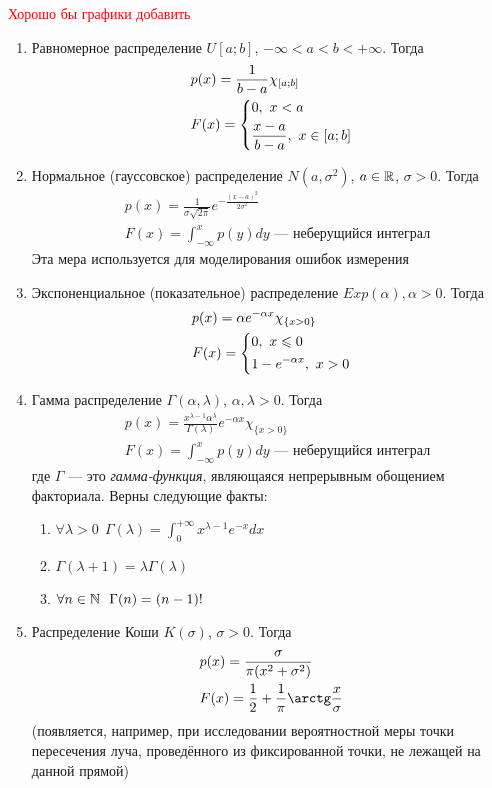 \textcolor{red}{Хорошо бы графики добавить}

\begin{enumerate}
	\item Равномерное распределение $U[a; b]$, $-\infty < a < b < +\infty$. Тогда
	\begin{align*}
		&{p(x) = \frac{1}{b - a}\chi_{[a; b]}}
		\\
		&{F(x) = \left\{\begin{aligned}
			&{0,\ x < a}
			\\
			&{\frac{x - a}{b - a},\ x \in [a; b]}
		\end{aligned}\right.}
	\end{align*}
	
	\item Нормальное (гауссовское) распределение $N(a, \sigma^2)$, $a \in \mathbb{R}$, $\sigma > 0$. Тогда
	\begin{align*}
		&{p(x) = \frac{1}{\sigma\sqrt{2\pi}}e^{-\frac{(x - a)^2}{2\sigma^2}}}
		\\
		&{F(x) = \int_{-\infty}^x p(y)dy \text{ --- неберущийся интеграл}}
	\end{align*}
	Эта мера используется для моделирования ошибок измерения
	
	\item Экспоненциальное (показательное) распределение $Exp(\alpha), \alpha > 0$. Тогда
	\begin{align*}
		&{p(x) = \alpha e^{-\alpha x}\chi_{\{x > 0\}}}
		\\
		&{F(x) = \left\{\begin{aligned}
			&{0,\ x \leqslant 0}
			\\
			&{1 - e^{-\alpha x},\ x > 0}
		\end{aligned}\right.}
	\end{align*}
	
	\item Гамма распределение $\Gamma(\alpha, \lambda)$, $\alpha, \lambda > 0$. Тогда
	\begin{align*}
		&{p(x) = \frac{x^{\lambda - 1}\alpha^\lambda}{\Gamma(\lambda)}e^{-\alpha x} \chi_{\{x > 0\}}}
		\\
		&{F(x) = \int_{-\infty}^x p(y)dy \text{ --- неберущийся интеграл}}
	\end{align*}
	где $\Gamma$ --- это \textit{гамма-функция}, являющаяся непрерывным обощением факториала. Верны следующие факты:
	\begin{enumerate}
		\item \(\forall \lambda > 0\ \ \Gamma(\lambda) = \int_0^{+\infty} x^{\lambda - 1}e^{-x}dx\)
		
		\item \(\Gamma(\lambda + 1) = \lambda\Gamma(\lambda)\)
		
		\item \(\forall n \in \mathbb{N}\ \ \Gamma(n) = (n - 1)!\)
	\end{enumerate}

	\item Распределение Коши $K(\sigma)$, $\sigma > 0$. Тогда
	\begin{align*}
		&{p(x) = \frac{\sigma}{\pi(x^2 + \sigma^2)}}
		\\
		&{F(x) = \frac{1}{2} + \frac{1}{\pi} \arctg \frac{x}{\sigma}}
	\end{align*}
	(появляется, например, при исследовании вероятностной меры точки пересечения луча, проведённого из фиксированной точки, не лежащей на данной прямой)
\end{enumerate}

